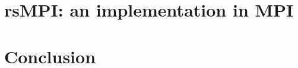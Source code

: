 \documentclass[pdftex,final]{pittetd}   %
\begin{document}
\chapter{\texorpdfstring{\MakeLowercase{rs}MPI}{rsMPI}: an implementation in MPI}
\label{chapter:implementation}


\chapter{Conclusion}
\label{chapter:summary}




%
\end{document}
